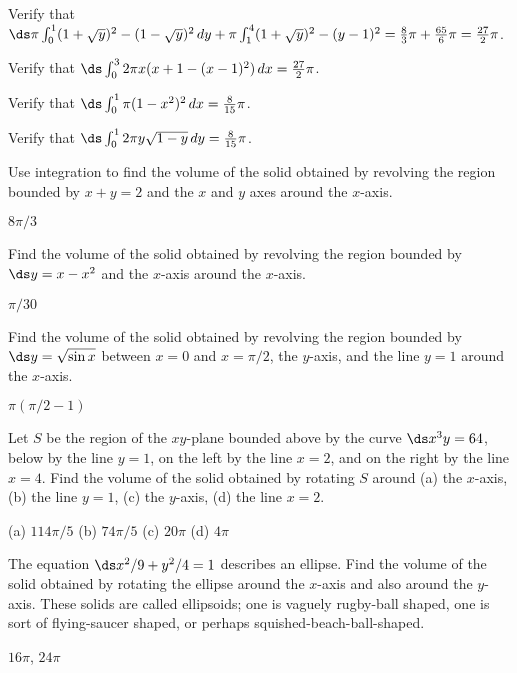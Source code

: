 \begin{exercises}

\exercise
Verify that $\ds\pi\int_0^1 (1+\sqrt{y})^2-(1-\sqrt{y})^2\,dy+
\pi\int_1^4  (1+\sqrt{y})^2-(y-1)^2={8\over3}\pi + {65\over6}\pi
={27\over2}\pi$.

\exercise Verify that $\ds\int_0^3 2\pi x(x+1-(x-1)^2)\,dx={27\over2}\pi$.

\exercise Verify that $\ds \int_0^1 \pi(1-x^2)^2\,dx={8\over15}\pi$.

\exercise Verify that $\ds \int_0^1 2\pi y \sqrt{1-y}\,dy={8\over15}\pi$.

\exercise
Use integration to find the volume of the solid obtained by revolving 
the region bounded by $x+y=2$ and the $x$ and $y$ axes around the
$x$-axis. 
\begin{answer} $8\pi/3$
\end{answer}

\exercise
Find the volume of the solid obtained by revolving 
the region bounded by $\ds y=x-x^2$
and the $x$-axis around the
$x$-axis. 
\begin{answer} $\pi/30$
\end{answer}

\exercise
Find the volume of the solid obtained by revolving 
the region bounded by $\ds y=\sqrt{\sin x}$ between $x=0$ and
$x=\pi/2$, the $y$-axis, and the line
$y=1$ around the
$x$-axis. 
\begin{answer} $\pi(\pi/2-1)$
\end{answer}

\exercise
Let $S$ be the region of the $xy$-plane bounded above by the curve
$\ds x^3y=64$, below by the line $y=1$, on the left by  the line $x=2$, and
on the right by the line $x=4$.  Find
the volume of the solid obtained by rotating $S$ around (a) the $x$-axis,
(b) the line $y=1$, (c) the $y$-axis, (d) the line $x=2$.
\begin{answer} (a) $114\pi/5$ (b) $74\pi/5$ (c) $20\pi$\hfill\break
(d) $4\pi$
\end{answer}

\exercise The equation $\ds x^2/9+y^2/4=1$ describes an ellipse.  Find the
volume of the solid obtained by rotating the ellipse around the
$x$-axis and also around the $y$-axis. These solids are
called {\dfont ellipsoids\/}; one is vaguely rugby-ball shaped, one is
sort of flying-saucer shaped, or perhaps squished-beach-ball-shaped.
\begin{answer} $16\pi$, $24\pi$
\end{answer}


\end{exercises}
